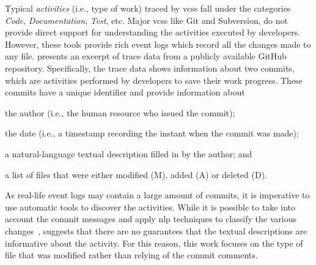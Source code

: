 
%

  
Typical \emph{activities} (i.e., type of work) traced by \glspl{vcs} fall under the categories \textsl{Code}, \textsl{Documentation}, \textsl{Test}, etc. Major \glspl{vcs} like Git and Subversion, do not provide direct support for understanding the activities executed by developers. However, these tools provide rich event logs which record all the changes made to any file. %
 presents an excerpt of trace data from a publicly available GitHub repository. Specifically, the trace data shows information about two commits, which are activities performed by developers to save their work progress. These commits have a unique identifier and provide information about \begin{inparaenum}[\itshape i)]
\item the author (i.e., the human resource who issued the commit);
\item the date (i.e., a timestamp recording the instant when the commit was made);
\item a natural-language textual description filled in by the author; and
\item a list of files that were either modified (M), added (A) or deleted (D).
\end{inparaenum}




As real-life event logs may contain a large amount of commits, it is imperative to use automatic tools to discover the activities. 
While it is possible to take into account the commit messages and apply \gls{nlp} techniques to classify the various changes~\cite{DBLP:conf/edoc/AgrawalATBRT16},  suggests that there are no guarantees that the textual descriptions are informative about the activity. For this reason, this work focuses on the type of file
that was modified rather than relying of the commit comments. 

